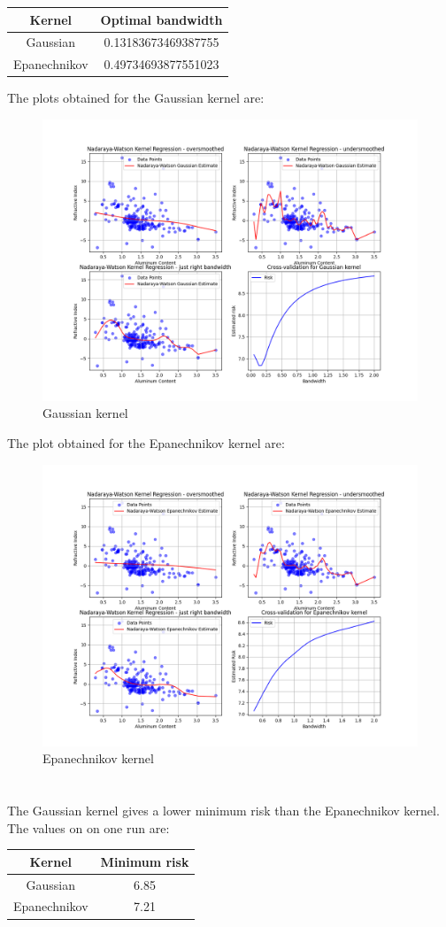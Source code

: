 \begin{center}
  \begin{tabular}{| c | c |}
    \hline
    Kernel & Optimal bandwidth \\
    \hline
    Gaussian & 0.13183673469387755 \\
    Epanechnikov & 0.49734693877551023 \\
    \hline
  \end{tabular}
\end{center}
The plots obtained for the Gaussian kernel are:
\begin{figure}[H]
    \centering
    \includegraphics[width=0.6\linewidth]{assets//images/gaussian_kernel_regression.png}
    \caption{Gaussian kernel}
    \label{fig:4.1}
\end{figure}
The plot obtained for the Epanechnikov kernel are:
\begin{figure}[H]
    \centering
    \includegraphics[width=0.6\linewidth]{assets//images/epanechnikov_kernel_regression.png}
    \caption{Epanechnikov kernel}
    \label{fig:4.2}
\end{figure}

\section{}

The Gaussian kernel gives a lower minimum risk than the Epanechnikov kernel. The values on on one run are:
\begin{center}
  \begin{tabular}{| c | c |}
    \hline
    Kernel & Minimum risk \\
    \hline
    Gaussian & 6.85 \\
    Epanechnikov & 7.21 \\
    \hline
  \end{tabular}
\end{center}

